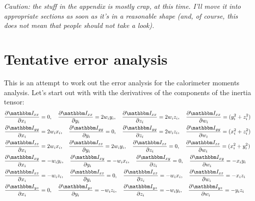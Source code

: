 \documentclass[a4paper,11pt]{article}
\newcommand{\pder}[2]{\frac{\partial#1}{\partial#2}}
\newcommand{\itm}{\mathbbm I}
\newcommand{\itc}[1]{\itm_{#1}}
\begin{document}
\clearpage
\appendix

\emph{Caution: the stuff in the appendix is mostly crap, at this time.
I'll move it into appropriate sections as soon as it's in a reasonable shape
(and, of course, this does not mean that people should not take a look).}

\section{Tentative error analysis}

This is an attempt to work out the error analysis for the calorimeter moments
analysis. Let's start out with with the derivatives of the components of the
inertia tensor:
\begin{align}
\pder{\itc{xx}}{x_i} &= 0,\quad
\pder{\itc{xx}}{y_i}  = 2w_iy_i,\quad
\pder{\itc{xx}}{z_i}  = 2w_iz_i,\quad
\pder{\itc{xx}}{w_i}  = (y_i^2 + z_i^2)\\
\pder{\itc{yy}}{x_i} &= 2w_ix_i,\quad
\pder{\itc{yy}}{y_i}  = 0,\quad
\pder{\itc{yy}}{z_i}  = 2w_iz_i,\quad
\pder{\itc{yy}}{w_i}  = (x_i^2 + z_i^2)\\
\pder{\itc{zz}}{x_i} &= 2w_ix_i,\quad
\pder{\itc{zz}}{y_i}  = 2w_iy_i,\quad
\pder{\itc{zz}}{z_i}  = 0,\quad
\pder{\itc{zz}}{w_i}  = (x_i^2 + y_i^2)\\
\pder{\itc{xy}}{x_i} &= -w_iy_i,\quad
\pder{\itc{xy}}{y_i}  = -w_ix_i,\quad
\pder{\itc{xy}}{z_i}  = 0,\quad
\pder{\itc{xy}}{w_i}  = -x_iy_i\\
\pder{\itc{xz}}{x_i} &= -w_iz_i,\quad
\pder{\itc{xz}}{y_i}  = 0,\quad
\pder{\itc{xz}}{z_i}  = -w_ix_i,\quad
\pder{\itc{xz}}{w_i}  = -x_iz_i\\
\pder{\itc{yz}}{x_i} &= 0,\quad
\pder{\itc{yz}}{y_i}  = -w_iz_i,\quad
\pder{\itc{yz}}{z_i}  = -w_iy_i,\quad
\pder{\itc{yz}}{w_i}  = -y_iz_i
\end{align}
\end{document}
